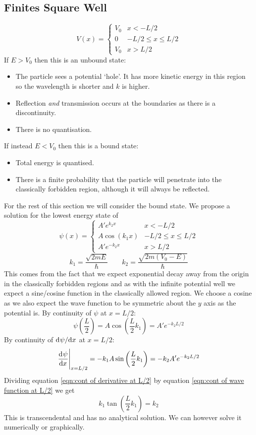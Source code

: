 \documentclass{article}
\begin{document}
    \subsection{Finites Square Well}
    \[
        V(x) =
        \begin{cases}
            V_0 & x < -L/2\\
            0 & -L/2 \le x \le L/2\\
            V_0 & x > L/2
        \end{cases}
    \]
    If \(E > V_0\) then this is an unbound state:
    \begin{itemize}
        \item The particle sees a potential `hole'. 
        It has more kinetic energy in this region so the wavelength is shorter and \(k\) is higher.
        \item Reflection \emph{and} transmission occurs at the boundaries as there is a discontinuity.
        \item There is no quantisation.
    \end{itemize}
    If instead \(E < V_0\) then this is a bound state:
    \begin{itemize}
        \item Total energy is quantised.
        \item There is a finite probability that the particle will penetrate into the classically forbidden region, although it will always be reflected.
    \end{itemize}
    For the rest of this section we will consider the bound state.
    We propose a solution for the lowest energy state of
    \[
        \psi(x) = 
        \begin{cases}
            A'e^{k_2x} & x < -L/2\\
            A \cos(k_1x) & -L/2 \le x \le L/2\\
            A'e^{-k_2x} & x > L/2
        \end{cases}
    \]
    \[k_1 = \frac{\sqrt{2mE}}{\hbar}\qquad k_2 = \frac{\sqrt{2m(V_0 - E)}}{\hbar}\]
    This comes from the fact that we expect exponential decay away from the origin in the classically forbidden regions and as with the infinite potential well we expect a sine/cosine function in the classically allowed region.
    We choose a cosine as we also expect the wave function to be symmetric about the \(y\) axis as the potential is.
    By continuity of \(\psi\) at \(x = L/2\):
    \begin{equation}\label{eqn:cont of wave function at L/2}
        \psi\left(\frac{L}{2}\right) = A\cos\left(\frac{L}{2}k_1\right) = A' e^{-k_2 L/2}
    \end{equation}
    By continuity of \(\mathrm{d}^{}{\psi}/\mathrm{d}{x}^{}\) at \(x = L/2\):
    \begin{equation}\label{eqn:cont of derivative at L/2}
        \dv[]{\psi}{x}\Biggr|_{x=L/2} = -k_1A\sin\left(\frac{L}{2}k_1\right) = -k_2A' e^{-k_2 L/2}
    \end{equation}
    Dividing equation \ref{eqn:cont of derivative at L/2} by equation \ref{eqn:cont of wave function at L/2} we get
    \[k_1 \tan\left(\frac{L}{2}k_1\right) = k_2\]
    This is transcendental and has no analytical solution.
    We can however solve it numerically or graphically.
    
\end{document}
